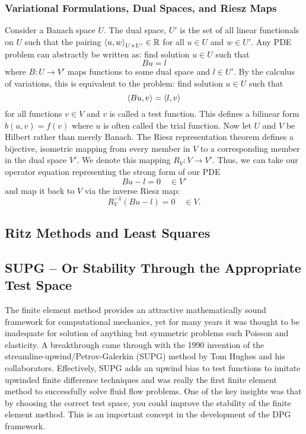 \documentclass{article}
\begin{document}
\subsubsection{Variational Formulations, Dual Spaces, and Riesz Maps}
Consider a Banach space $U$. The dual space, $U'$ is the set of all linear functionals on $U$ such that the pairing $\left\langle u,w \right\rangle_{U\times U'}\in\mathbb{R}$ 
for all $u\in U$ and $w\in U'$.
Any PDE problem can abstractly be written as: find solution $u\in U$ such that
\[
Bu=l
\]
where $B:U\rightarrow V'$ maps functions to some dual space and $l\in U'$.
By the calculus of variations, this is equivalent to the problem: find solution $u\in U$ such that
\[
\left\langle Bu,v \right\rangle=\left\langle l,v \right\rangle
\]
for all functions $v\in V$ and $v$ is called a test function.
This defines a bilinear form $b(u,v)=f(v)$ where $u$ is often called the trial function.
Now let $U$ and $V$ be Hilbert rather than merely Banach.
The Riesz representation theorem defines a bijective, isometric mapping from every member in $V$ to a corresponding member in the dual space $V'$.
We denote this mapping $R_V:V\rightarrow V'$.
Thus, we can take our operator equation representing the strong form of our PDE
\[
Bu-l=0\quad\in V'
\]
and map it back to $V$ via the inverse Riesz map:
\[
R_V^{-1}(Bu-l)=0\quad\in V.
\]

\subsection{Ritz Methods and Least Squares}

\subsection{SUPG -- Or Stability Through the Appropriate Test Space}
The finite element method provides an attractive mathematically sound framework for computational mechanics,
yet for many years it was thought to be inadequate for solution of anything but symmetric problems such Poisson and elasticity.
A breakthrough came through with the 1990 invention of the streamline-upwind/Petrov-Galerkin (SUPG) method by Tom Hughes \cite{SUPG} and his collaborators.
Effectively, SUPG adds an upwind bias to test functions to imitate upwinded finite difference techniques 
and was really the first finite element method to successfully solve fluid flow problems.
One of the key insights was that by choosing the correct test space, you could improve the stability of the finite element method.
This is an important concept in the development of the DPG framework.
\end{document}
